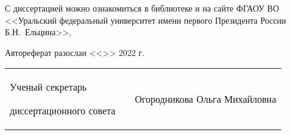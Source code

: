 \vspace{0.008\paperheight plus1fill}
С диссертацией можно ознакомиться в библиотеке
и на сайте ФГАОУ ВО
<<Уральский федеральный университет имени первого Президента России Б.Н.~Ельцина>>,

\vspace{0.008\paperheight plus1fill}
{
Автореферат разослан
<<\underline{\hspace{2em}}>>
\underline{\hspace{7em}}
2022 г.}

\vspace{0.008\paperheight plus1fill}
\noindent%
\begin{tabularx}{\textwidth}{@{}%
>{\raggedright\arraybackslash}b{18em}@{}
>{\centering\arraybackslash}X
r
@{}}
    Ученый секретарь\par
    диссертационного совета
    &
    &
    Огородникова Ольга Михайловна
\end{tabularx}


\clearpage
